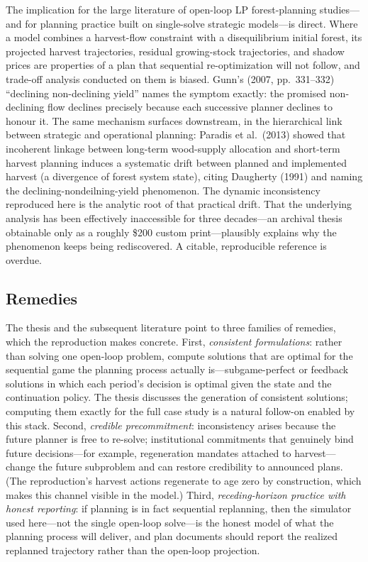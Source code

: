 \documentclass[12pt]{article}
\begin{document}
The implication for the large literature of open-loop LP forest-planning studies---and for planning practice built on single-solve strategic models---is direct. Where a model combines a harvest-flow constraint with a disequilibrium initial forest, its projected harvest trajectories, residual growing-stock trajectories, and shadow prices are properties of a plan that sequential re-optimization will not follow, and trade-off analysis conducted on them is biased. Gunn's (2007, pp.~331--332) ``declining non-declining yield'' names the symptom exactly: the promised non-declining flow declines precisely because each successive planner declines to honour it. The same mechanism surfaces downstream, in the hierarchical link between strategic and operational planning: Paradis et al.~(2013) showed that incoherent linkage between long-term wood-supply allocation and short-term harvest planning induces a systematic drift between planned and implemented harvest (a divergence of forest system state), citing Daugherty (1991) and naming the declining-nondeilning-yield phenomenon. The dynamic inconsistency reproduced here is the analytic root of that practical drift. That the underlying analysis has been effectively inaccessible for three decades---an archival thesis obtainable only as a roughly \$200 custom print---plausibly explains why the phenomenon keeps being rediscovered. A citable, reproducible reference is overdue.

\hypertarget{remedies}{%
\subsection{Remedies}\label{remedies}}

The thesis and the subsequent literature point to three families of remedies, which the reproduction makes concrete. First, \emph{consistent formulations}: rather than solving one open-loop problem, compute solutions that are optimal for the sequential game the planning process actually is---subgame-perfect or feedback solutions in which each period's decision is optimal given the state and the continuation policy. The thesis discusses the generation of consistent solutions; computing them exactly for the full case study is a natural follow-on enabled by this stack. Second, \emph{credible precommitment}: inconsistency arises because the future planner is free to re-solve; institutional commitments that genuinely bind future decisions---for example, regeneration mandates attached to harvest---change the future subproblem and can restore credibility to announced plans. (The reproduction's harvest actions regenerate to age zero by construction, which makes this channel visible in the model.) Third, \emph{receding-horizon practice with honest reporting}: if planning is in fact sequential replanning, then the simulator used here---not the single open-loop solve---is the honest model of what the planning process will deliver, and plan documents should report the realized replanned trajectory rather than the open-loop projection.
\end{document}
